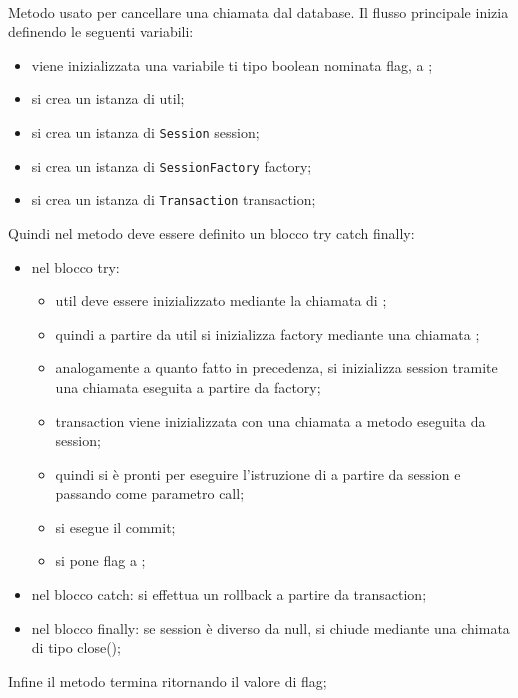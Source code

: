 \begin{description}
	\item{}\\
	Metodo usato per cancellare una chiamata dal database. Il flusso principale inizia definendo le seguenti variabili:
	\begin{itemize}
		\item viene inizializzata una variabile ti tipo boolean nominata flag, a ;
		\item si crea un istanza di  util;
		\item si crea un istanza di \texttt{Session} session;
		\item si crea un istanza di \texttt{SessionFactory} factory;
		\item si crea un istanza di \texttt{Transaction} transaction;
	\end{itemize}
	Quindi nel metodo deve essere definito un blocco try catch finally:
	\begin{itemize}
		\item nel blocco try:
		\begin{itemize}
			\item util deve essere inizializzato mediante la chiamata  di ;
			\item quindi a partire da util si inizializza factory mediante una chiamata ;
			\item analogamente a quanto fatto in precedenza, si inizializza session tramite una chiamata  eseguita a partire da factory;
			\item transaction viene inizializzata con una chiamata a metodo  eseguita da session;
			\item quindi si è pronti per eseguire l'istruzione di  a partire da session e passando come parametro call;
			\item si esegue il commit;
			\item si pone flag a ;
		\end{itemize}
		\item nel blocco catch: si effettua un rollback a partire da transaction;
		\item nel blocco finally: se session è diverso da null, si chiude mediante una chimata di tipo close();
	\end{itemize}
	Infine il metodo termina ritornando il valore di flag;
	

\end{description}
